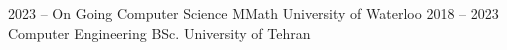 \documentclass[9pt]{developercv} %
\begin{document}


\begin{entrylist}
	\entry
		{2023 -- On Going}
		{Computer Science MMath}
		{University of Waterloo}
		{}
	\entry
		{2018 -- 2023}
		{Computer Engineering BSc.}
		{University of Tehran}
		{}
\end{entrylist}



\end{document}
